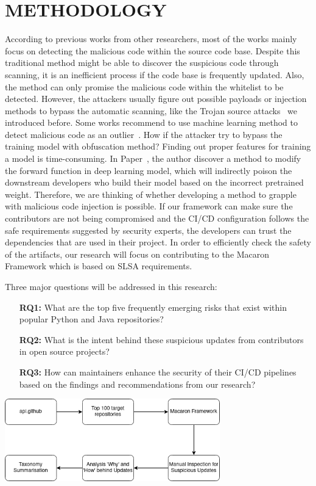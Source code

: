 \section{METHODOLOGY}
According to previous works from other researchers, most of the works mainly focus on detecting the malicious
code within the source code base. Despite this traditional method might be able to discover the suspicious 
code through scanning, it is an inefficient process if the code base is frequently updated. Also, the method 
can only promise the malicious code within the whitelist to be detected. However, the attackers usually 
figure out possible payloads or injection methods to bypass the automatic scanning, like the Trojan source 
attacks~\cite{boucher2023trojan} we introduced before. 
Some works recommend to use machine learning method to detect malicious code as an outlier~\cite{garrett2019detecting}.
How if the attacker try to bypass the training model with obfuscation method? Finding out proper features for
training a model is time-consuming. In Paper~\cite{zheng2023careful}, 
the author discover a method to modify
the forward function in deep learning model, which will indirectly poison the downstream developers who build 
their model based on the incorrect pretrained weight. 
Therefore, we are thinking of whether developing a method to grapple with malicious code injection is possible.
If our framework can make sure the contributors are not being compromised and the CI/CD configuration follows
the safe requirements suggested by security experts, the developers can trust the dependencies that are
used in their project. 
In order to efficiently check the safety of the artifacts, our research will focus on contributing to the Macaron
Framework which is based on SLSA requirements.

Three major questions will be addressed in this research:
\begin{enumerate}
    \item[{\textbf{RQ1:}}] What are the top five frequently emerging risks that exist within popular Python and Java repositories?
    \item[{\textbf{RQ2:}}] What is the intent behind these suspicious updates from contributors in open source projects?
    \item[{\textbf{RQ3:}}] How can maintainers enhance the security of their CI/CD pipelines based on the findings and recommendations from our research?
\end{enumerate}

\begin{center}
    \includegraphics[width=0.7\textwidth]{./screenshot/research_flow.png}
\end{center}

